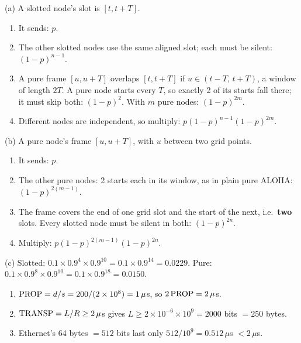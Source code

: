 (a) A slotted node's slot is $[t,t+T]$.
\begin{enumerate}
  \item It sends: $p$.
  \item The other slotted nodes use the same aligned slot; each must be silent: $(1-p)^{n-1}$.
  \item A pure frame $[u,u+T]$ overlaps $[t,t+T]$ if $u\in(t-T,\,t+T)$, a window of length $2T$. A pure node starts every $T$, so exactly 2 of its starts fall there; it must skip both: $(1-p)^2$. With $m$ pure nodes: $(1-p)^{2m}$.
  \item Different nodes are independent, so multiply: $p(1-p)^{n-1}(1-p)^{2m}$.
\end{enumerate}
(b) A pure node's frame $[u,u+T]$, with $u$ between two grid points.
\begin{enumerate}
  \item It sends: $p$.
  \item The other pure nodes: 2 starts each in its window, as in plain pure ALOHA: $(1-p)^{2(m-1)}$.
  \item The frame covers the end of one grid slot and the start of the next, i.e.\ \textbf{two} slots. Every slotted node must be silent in both: $(1-p)^{2n}$.
  \item Multiply: $p(1-p)^{2(m-1)}(1-p)^{2n}$.
\end{enumerate}
(c) Slotted: $0.1\times0.9^{4}\times0.9^{10}=0.1\times0.9^{14}=0.0229$. Pure: $0.1\times0.9^{8}\times0.9^{10}=0.1\times0.9^{18}=0.0150$.

\begin{enumerate}
  \item $\text{PROP}=d/s=200/(2\times10^8)=1\,\mu$s, so $2\,\text{PROP}=2\,\mu$s.
  \item $\text{TRANSP}=L/R\ge2\,\mu$s gives $L\ge2\times10^{-6}\times10^9=2000$ bits $=250$ bytes.
  \item Ethernet's 64 bytes $=512$ bits last only $512/10^9=0.512\,\mu$s $<2\,\mu$s.
\end{enumerate}

